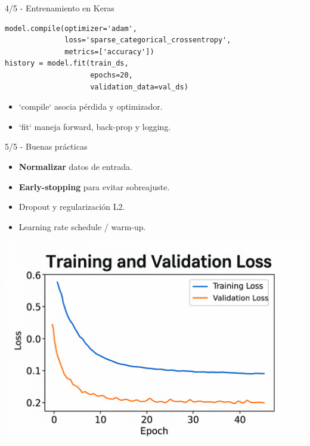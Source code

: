 \documentclass[8pt,spanish]{beamer}
\begin{document}
\begin{frame}[fragile]{4/5  -  Entrenamiento en Keras}
  \begin{verbatim}
model.compile(optimizer='adam',
              loss='sparse_categorical_crossentropy',
              metrics=['accuracy'])
history = model.fit(train_ds,
                    epochs=20,
                    validation_data=val_ds)
  \end{verbatim}
  \begin{itemize}
    \item `compile` asocia pérdida y optimizador.
    \item `fit` maneja forward, back-prop y logging.
  \end{itemize}
\end{frame}

\begin{frame}{5/5  -  Buenas prácticas}
  \begin{itemize}
    \item \textbf{Normalizar} datos de entrada.
    \item \textbf{Early-stopping} para evitar sobreajuste.
    \item Dropout y regularización L2.
    \item Learning rate schedule / warm-up.
  \end{itemize}
  \centering
  \includegraphics[width=.55\textwidth]{val_loss.png}
\end{frame}
\end{document}
